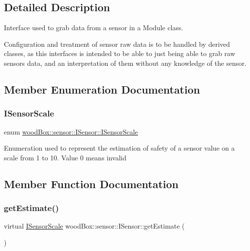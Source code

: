 \subsection{Detailed Description}
Interface used to grab data from a sensor in a Module class.

Configuration and treatment of sensor raw data is to be handled by derived classes, as this interfaces is intended to be able to just being able to grab raw sensors data, and an interpretation of them without any knowledge of the sensor. 

\subsection{Member Enumeration Documentation}
\mbox{\label{classwood_box_1_1sensor_1_1_i_sensor_aa377bda61ed0d4a1d7e1a7bffe459452}} 
\subsubsection{\texorpdfstring{I\+Sensor\+Scale}{ISensorScale}}
{\footnotesize\ttfamily enum \mbox{\hyperlink{classwood_box_1_1sensor_1_1_i_sensor_aa377bda61ed0d4a1d7e1a7bffe459452}{wood\+Box\+::sensor\+::\+I\+Sensor\+::\+I\+Sensor\+Scale}}}

Enumeration used to represent the estimation of safety of a sensor value on a scale from 1 to 10. Value 0 means invalid 

\subsection{Member Function Documentation}
\mbox{\label{classwood_box_1_1sensor_1_1_i_sensor_afb01c2473efc4a823bf5dada0048d2bc}} 
\subsubsection{\texorpdfstring{get\+Estimate()}{getEstimate()}}
{\footnotesize\ttfamily virtual \mbox{\hyperlink{classwood_box_1_1sensor_1_1_i_sensor_aa377bda61ed0d4a1d7e1a7bffe459452}{I\+Sensor\+Scale}} wood\+Box\+::sensor\+::\+I\+Sensor\+::get\+Estimate (\begin{DoxyParamCaption}{ }\end{DoxyParamCaption})\hspace{0.3cm}{\ttfamily [pure virtual]}}

